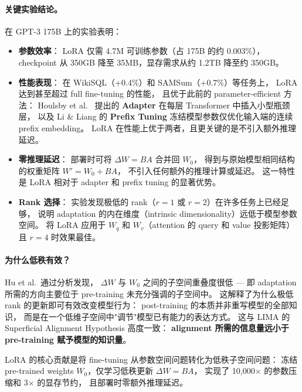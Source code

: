 \paragraph{关键实验结论。}
在 GPT-3 175B 上的实验表明：
\begin{itemize}[leftmargin=2em]
  \item \textbf{参数效率}：
    LoRA 仅需 4.7M 可训练参数（占 175B 的约 0.003\%），
    checkpoint 从 350GB 降至 35MB，显存需求从约 1.2TB 降至约 350GB。
  \item \textbf{性能表现}：
    在 WikiSQL（+0.4\%）和 SAMSum（+0.7\%）等任务上，
    LoRA 达到甚至超过 full fine-tuning 的性能，
    且优于此前的 parameter-efficient 方法：
    Houlsby et al.\ \cite{houlsby2019adapters} 提出的 \textbf{Adapter}
    在每层 Transformer 中插入小型瓶颈层，
    以及 Li \& Liang \cite{li2021prefix} 的 \textbf{Prefix Tuning}
    冻结模型参数仅优化输入端的连续 prefix embedding。
    LoRA 在性能上优于两者，且更关键的是不引入额外推理延迟。
  \item \textbf{零推理延迟}：
    部署时可将 $\Delta W = BA$ 合并回 $W_0$，
    得到与原始模型相同结构的权重矩阵 $W' = W_0 + BA$，
    不引入任何额外的推理计算或延迟。
    这一特性是 LoRA 相对于 adapter 和 prefix tuning 的显著优势。
  \item \textbf{Rank 选择}：
    实验发现极低的 rank（$r = 1$ 或 $r = 2$）在许多任务上已经足够，
    说明 adaptation 的内在维度（intrinsic dimensionality）远低于模型参数空间。
    将 LoRA 应用于 $W_q$ 和 $W_v$（attention 的 query 和 value 投影矩阵）
    且 $r = 4$ 时效果最佳。
\end{itemize}

\paragraph{为什么低秩有效？}
Hu et al.\ 通过分析发现，
$\Delta W$ 与 $W_0$ 之间的子空间重叠度很低 ---
即 adaptation 所需的方向主要位于 pre-training 未充分强调的子空间中。
这解释了为什么极低 rank 的更新即可有效改变模型行为：
post-training 的本质并非重写模型的全部知识，
而是在一个低维子空间中"调节"模型已有能力的表达方式。
这与 LIMA \cite{zhou2023lima} 的 Superficial Alignment Hypothesis 高度一致：
\textbf{alignment 所需的信息量远小于 pre-training 赋予模型的知识量}。

\begin{solutionbox}
LoRA 的核心贡献是将 fine-tuning 从参数空间问题转化为低秩子空间问题：
冻结 pre-trained weights $W_0$，仅学习低秩更新 $\Delta W = BA$，
实现了 10,000$\times$ 的参数压缩和 3$\times$ 的显存节约，
且部署时零额外推理延迟。
\end{solutionbox}

